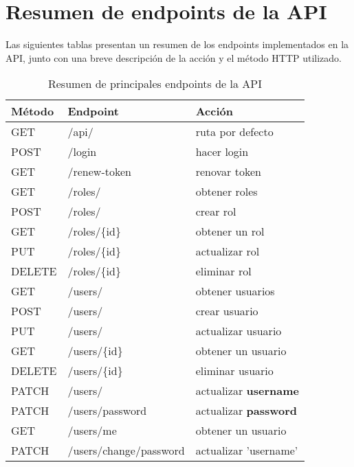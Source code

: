 \chapter{Resumen de endpoints de la API}

\label{AppendixA} 

Las siguientes tablas presentan un resumen de los endpoints implementados en la
API, junto con una breve descripción de la acción y el método HTTP utilizado.

\begin{table}[H]
    \centering
    \caption[Resumen de principales endpoints de la API]{Resumen de principales endpoints de la API}
    \begin{tabular}{l l l}
        \toprule
        \textbf{Método} & \textbf{Endpoint}      & \textbf{Acción}              \\
        \midrule
        GET             & /api/                                 & ruta por defecto         \\
        \midrule
        POST            & /login                 & hacer login                  \\
        GET             & /renew-token           & renovar token                \\
        \midrule
        GET             & /roles/                & obtener roles                \\
        POST            & /roles/                & crear rol                    \\
        GET             & /roles/\{id\}            & obtener un rol               \\
        PUT             & /roles/\{id\}            & actualizar rol               \\
        DELETE          & /roles/\{id\}            & eliminar rol                 \\
        \midrule
        GET             & /users/                & obtener usuarios             \\
        POST            & /users/                & crear usuario                \\
        PUT             & /users/                & actualizar usuario           \\
        GET             & /users/\{id\}            & obtener un usuario           \\
        DELETE          & /users/\{id\}            & eliminar usuario             \\
        PATCH           & /users/                & actualizar \textbf{username} \\
        PATCH           & /users/password        & actualizar \textbf{password} \\
        GET             & /users/me              & obtener un usuario           \\
        PATCH           & /users/change/password & actualizar 'username'        \\


\end{tabular}
\end{table}
